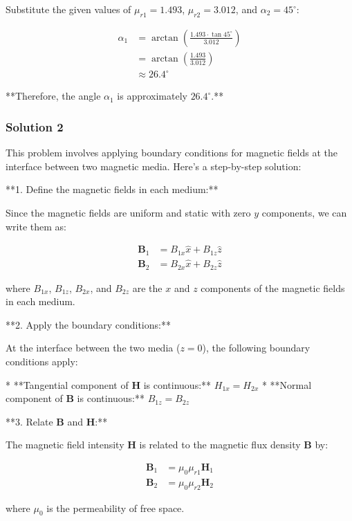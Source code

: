 \documentclass{article}
\begin{document}
Substitute the given values of $\mu_{r1} = 1.493$, $\mu_{r2} = 3.012$, and $\alpha_2 = 45^\circ$:

\begin{align*}
\alpha_1 &= \arctan \left( \frac{1.493 \cdot \tan 45^\circ}{3.012} \right) \\
&= \arctan \left( \frac{1.493}{3.012} \right) \\
&\approx 26.4^\circ
\end{align*}

**Therefore, the angle $\alpha_1$ is approximately $26.4^\circ$.**

\subsubsection{Solution 2}
This problem involves applying boundary conditions for magnetic fields at the interface between two magnetic media. Here's a step-by-step solution:

**1. Define the magnetic fields in each medium:**

Since the magnetic fields are uniform and static with zero $y$ components, we can write them as:

\begin{align*}
\mathbf{B}_1 &= B_{1x} \hat{x} + B_{1z} \hat{z} \\
\mathbf{B}_2 &= B_{2x} \hat{x} + B_{2z} \hat{z}
\end{align*}

where $B_{1x}$, $B_{1z}$, $B_{2x}$, and $B_{2z}$ are the $x$ and $z$ components of the magnetic fields in each medium.

**2. Apply the boundary conditions:**

At the interface between the two media ($z=0$), the following boundary conditions apply:

* **Tangential component of $\mathbf{H}$ is continuous:**
   $H_{1x} = H_{2x}$ 
* **Normal component of $\mathbf{B}$ is continuous:**
   $B_{1z} = B_{2z}$

**3. Relate $\mathbf{B}$ and $\mathbf{H}$:**

The magnetic field intensity $\mathbf{H}$ is related to the magnetic flux density $\mathbf{B}$ by:

\begin{align*}
\mathbf{B}_1 &= \mu_0 \mu_{r1} \mathbf{H}_1 \\
\mathbf{B}_2 &= \mu_0 \mu_{r2} \mathbf{H}_2
\end{align*}

where $\mu_0$ is the permeability of free space.
\end{document}
